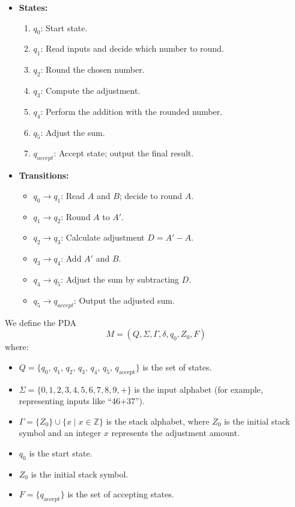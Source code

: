 \documentclass[11pt]{article}
\begin{document}
\begin{itemize}
    \item \textbf{States:}
    \begin{enumerate}
        \item $q_0$: Start state.
        \item $q_1$: Read inputs and decide which number to round.
        \item $q_2$: Round the chosen number.
        \item $q_3$: Compute the adjustment.
        \item $q_4$: Perform the addition with the rounded number.
        \item $q_5$: Adjust the sum.
        \item $q_{accept}$: Accept state; output the final result.
    \end{enumerate}
    \item \textbf{Transitions:}
    \begin{itemize}
        \item $q_0 \rightarrow q_1$: Read $A$ and $B$; decide to round $A$.
        \item $q_1 \rightarrow q_2$: Round $A$ to $A'$.
        \item $q_2 \rightarrow q_3$: Calculate adjustment $D = A' - A$.
        \item $q_3 \rightarrow q_4$: Add $A'$ and $B$.
        \item $q_4 \rightarrow q_5$: Adjust the sum by subtracting $D$.
        \item $q_5 \rightarrow q_{accept}$: Output the adjusted sum.
    \end{itemize}
\end{itemize}


We define the PDA 
\[
M = (Q,\Sigma,\Gamma,\delta,q_0,Z_0,F)
\]
where:
\begin{itemize}
    \item \(Q = \{q_0,\, q_1,\, q_2,\, q_3,\, q_4,\, q_5,\, q_{\text{accept}}\}\) is the set of states.
    \item \(\Sigma = \{0,1,2,3,4,5,6,7,8,9,+\}\) is the input alphabet (for example, representing inputs like ``46+37'').
    \item \(\Gamma = \{Z_0\} \cup \{x \mid x \in \mathbb{Z}\}\) is the stack alphabet, where \(Z_0\) is the initial stack symbol and an integer \(x\) represents the adjustment amount.
    \item \(q_0\) is the start state.
    \item \(Z_0\) is the initial stack symbol.
    \item \(F = \{q_{\text{accept}}\}\) is the set of accepting states.
\end{itemize}
\end{document}
